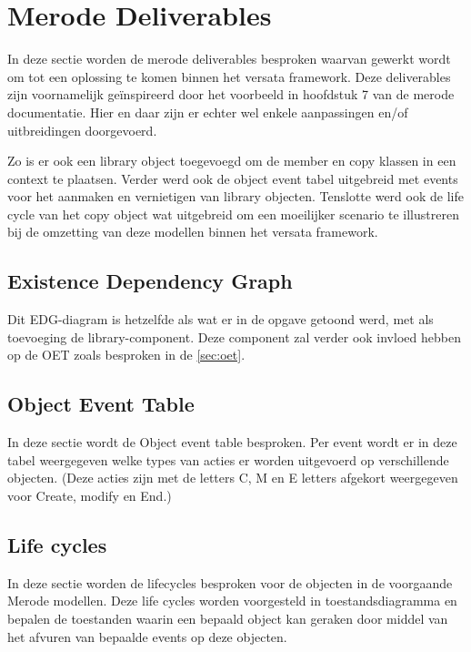 \section{Merode Deliverables}
\label{sec:deliverables}
In deze sectie worden de merode deliverables besproken waarvan gewerkt wordt om tot 
een oplossing te komen binnen het versata framework. Deze deliverables zijn voornamelijk
ge\"inspireerd door het voorbeeld in hoofdstuk 7 van de merode documentatie.
Hier en daar zijn er echter wel enkele aanpassingen en/of uitbreidingen doorgevoerd.

Zo is er ook een library object toegevoegd om de member en copy klassen in een context te plaatsen. Verder werd ook de object event tabel uitgebreid met events voor het aanmaken en vernietigen van library objecten. 
Tenslotte werd ook de life cycle van het copy object wat uitgebreid om een moeilijker scenario te illustreren bij de omzetting van deze modellen binnen het versata framework.
\subsection{Existence Dependency Graph}
Dit EDG-diagram is hetzelfde als wat er in de opgave getoond werd, met als toevoeging de
library-component. Deze component zal verder ook invloed hebben op de OET zoals besproken in de \ref{sec:oet}.
\subsection{Object Event Table}
In deze sectie wordt de Object event table besproken. Per event wordt er in deze tabel weergegeven
welke types van acties er worden uitgevoerd op verschillende objecten. (Deze acties zijn met de letters
C, M en E letters afgekort weergegeven voor Create, modify en End.)
\label{sec:oet}

\subsection{Life cycles}
In deze sectie worden de lifecycles besproken voor de objecten in de voorgaande Merode modellen.
Deze life cycles worden voorgesteld in toestandsdiagramma en bepalen de toestanden waarin een bepaald object kan geraken door middel van het afvuren van bepaalde events op deze objecten.

